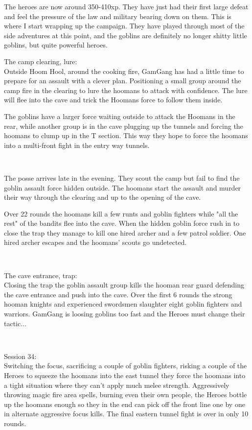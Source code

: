 \begin{readoutloud}
The heroes are now around 350-410xp. They have just had their first large defeat and feel the pressure of the law and military bearing down on them. This is where I start wrapping up the campaign. They have played through most of the side adventures at this point, and the goblins are definitely no longer shitty little goblins, but quite powerful heroes.
\end{readoutloud}

The camp clearing, lure:\\
Outside Hoom Hool, around the cooking fire, GamGang has had a little time to prepare for an assault with a clever plan. Positioning a small group around the camp fire in the clearing to lure the hoomans to attack with confidence.
The lure will flee into the cave and trick the Hoomans force to follow them inside.

The goblins have a larger force waiting outside to attack the Hoomans in the rear, while another group is in the cave plugging up the tunnels and forcing the hoomans to clump up in the T section. This way they hope to force the hoomans into a multi-front fight in the entry way tunnels.

\

The posse arrives late in the evening. They scout the camp but fail to find the goblin assault force hidden outside. The hoomans start the assault and murder their way through the clearing and up to the opening of the cave. 

Over 22 rounds the hoomans kill a few runts and goblin fighters while "all the rest" of the bandits flee into the cave. When the hidden goblin force rush in to close the trap they manage to kill one hired archer and a few patrol soldier. One hired archer escapes and the hoomans' scouts go undetected.

\

The cave entrance, trap:\\
Closing the trap the goblin assault group kills the hooman rear guard defending the cave entrance and push into the cave. Over the first 6 rounds the strong hooman knights and experienced swordsmen slaughter eight goblin fighters and warriors. GamGang is loosing goblins too fast and the Heroes must change their tactic...

\

Session 34:\\                                                           %
Switching the focus, sacrificing a couple of goblin fighters, risking a couple of the Heroes to squeeze the hoomans into the east tunnel they force the hoomans into a tight situation where they can't apply much melee strength. Aggressively throwing magic fire area spells, burning even their own people, the Heroes bottle up the hoomans enough so they in the end can pick off the front line one by one in alternate aggressive focus kills. The final eastern tunnel fight is over in only 10 rounds.

